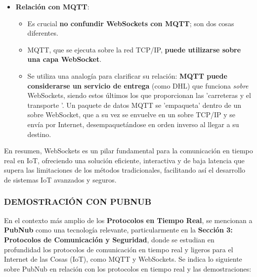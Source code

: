 \documentclass{report}
\begin{document}
\begin{itemize}
    \item \textbf{Relación con MQTT}:
    \begin{itemize}
        \item Es crucial \textbf{no confundir WebSockets con MQTT}; son dos cosas diferentes.
        \item MQTT, que se ejecuta sobre la red TCP/IP, \textbf{puede utilizarse sobre una capa WebSocket}.
        \item Se utiliza una analogía para clarificar su relación: \textbf{MQTT puede considerarse un servicio de entrega} (como DHL) que funciona 
        \textit{sobre} WebSockets, siendo estos últimos los que proporcionan las  'carreteras y el transporte '. Un paquete de datos MQTT se  'empaqueta' 
        dentro de un sobre WebSocket, que a su vez se envuelve en un sobre TCP/IP y se envía por Internet, desempaquetándose en orden inverso al llegar 
        a su destino.
    \end{itemize}
\end{itemize}
En resumen, WebSockets es un pilar fundamental para la comunicación en tiempo real en IoT, ofreciendo una solución eficiente, interactiva y de baja 
latencia que supera las limitaciones de los métodos tradicionales, facilitando así el desarrollo de sistemas IoT avanzados y seguros.

\subsubsection{DEMOSTRACIÓN CON PUBNUB}
En el contexto más amplio de los \textbf{Protocolos en Tiempo Real}, se  mencionan a \textbf{PubNub} como una tecnología relevante, particularmente 
en la \textbf{Sección 3: Protocolos de Comunicación y Seguridad}, donde se estudian en profundidad los protocolos de comunicación en tiempo real y ligeros 
para el Internet de las Cosas (IoT), como MQTT y WebSockets. Se indica lo siguiente sobre PubNub en relación con los protocolos en tiempo real 
y las demostraciones:
\end{document}

